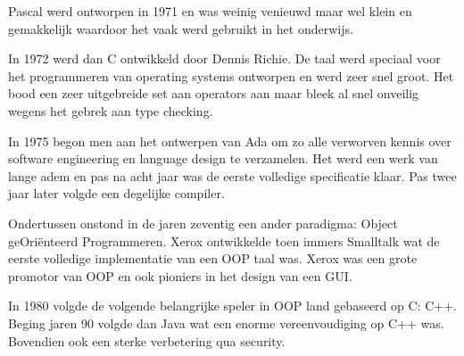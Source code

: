 \documentclass[../main.tex]{subfiles}
\begin{document}
\begin{solution}
Pascal werd ontworpen in 1971 en was weinig venieuwd maar wel klein en gemakkelijk waardoor het vaak werd gebruikt in het onderwijs.

In 1972 werd dan C ontwikkeld door Dennis Richie. 
De taal werd speciaal voor het programmeren van operating systems ontworpen en werd zeer snel groot.
Het bood een zeer uitgebreide set aan operators aan maar bleek al snel onveilig wegens het gebrek aan type checking.

In 1975 begon men aan het ontwerpen van Ada om zo alle verworven kennis over software engineering en language design te verzamelen.
Het werd een werk van lange adem en pas na acht jaar was de eerste volledige specificatie klaar.
Pas twee jaar later volgde een degelijke compiler.

Ondertussen onstond in de jaren zeventig een ander paradigma: Object geOri\"enteerd Programmeren.
Xerox ontwikkelde toen immers Smalltalk wat de eerste volledige implementatie van een OOP taal was.
Xerox was een grote promotor van OOP en ook  pioniers in het design van een GUI.

In 1980 volgde de volgende belangrijke speler in OOP land gebaseerd op C: C++.
Beging jaren 90 volgde dan Java wat een enorme vereenvoudiging op C++ was.
Bovendien ook een sterke verbetering qua security.

\end{solution}
\end{document}
